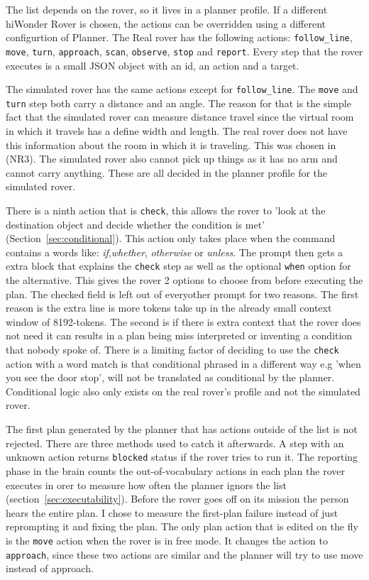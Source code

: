 The list depends on the rover, so it lives in a planner profile. If a different hiWonder Rover is chosen, the 
actions can be overridden using a different configurtion of Planner.
The Real rover has the following actions: \texttt{follow\_line}, \texttt{move},
\texttt{turn}, \texttt{approach}, \texttt{scan}, \texttt{observe}, \texttt{stop}
and \texttt{report}. Every step that the rover executes is a small JSON object with an id, an action and a target.

The simulated rover has the same actions except for \texttt{follow\_line}. The \texttt{move} and \texttt{turn} step both 
carry a distance and an angle. The reason for that is the simple fact that the simulated rover can measure distance travel 
since the virtual room in which it travels has a define width and length. The real rover does not have this information about the 
room in which it is traveling. This was chosen in (NR3). The simulated rover also cannot pick up things as it has no arm and cannot
carry anything. These are all decided in the planner profile for the simulated rover. 

There is a ninth action that is \texttt{check}, this allows the rover to 'look at the destination object and decide whether
the condition is met' (Section~\ref{sec:conditional}). This action only takes place when the command contains a words like: 
\emph{if},\emph{whether}, \emph{otherwise} or \emph{unless}. The prompt then gets a extra block that explains the \texttt{check} step
as well as the optional \texttt{when} option for the alternative. This gives the rover 2 options to choose from before executing the plan.
The checked field is left out of everyother prompt for two reasons. The first reason is the extra line is more tokens take up in the already small
context window of 8192-tokens. The second is if there is extra context that the rover does not need it can results in a plan being miss interpreted or
inventing a condition that nobody spoke of. There is a limiting factor of deciding to use the \texttt{check} action with a word match is
that conditional phrased in a different way e.g 'when you see the door stop', will not be translated as conditional by the planner. Conditional logic also
only exists on the real rover's profile and not the simulated rover. 

The first plan generated by the planner that has actions outside of the list is not rejected. There are three methods used to catch it afterwards.
A step with an unknown action returns \texttt{blocked} status if the rover tries to run it. The reporting phase in the brain counts the out-of-vocabulary
actions in each plan the rover executes in orer to measure how often the planner ignors the list (section~\ref{sec:executability}). Before the rover goes off
on its mission the person hears the entire plan. I chose to measure the first-plan failure instead of just reprompting it and fixing the plan. 
The only plan action that is edited on the fly is the \texttt{move} action when the rover is in free mode. It changes the action to \texttt{approach}, since these two
actions are similar and the planner will try to use move instead of approach. 

